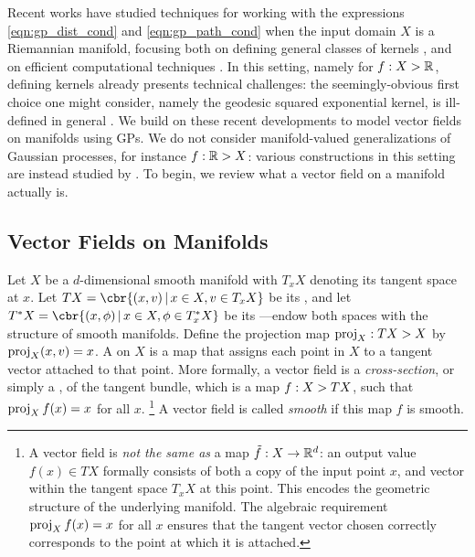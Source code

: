 Recent works have studied techniques for working with the expressions \eqref{eqn:gp_dist_cond} and \eqref{eqn:gp_path_cond} when the input domain $X$ is a Riemannian manifold, focusing both on defining general classes of kernels \cite{Borovitskiy2020}, and on efficient computational techniques \cite{wilson2020pathwise,wilson2021pathwise}.
In this setting, namely for $f : X \-> \mathbb{R}$, defining kernels already presents technical challenges: the seemingly-obvious first choice one might consider, namely the geodesic squared exponential kernel, is ill-defined in general \cite{feragen2015geodesic}.
We build on these recent developments to model vector fields on manifolds using GPs.
We do not consider manifold-valued generalizations of Gaussian processes, for instance $f : \mathbb{R} \-> X$: various constructions in this setting are instead studied by \textcite{stroock2000introduction, emery2012stochastic,mallasto2018wrapped,mallasto2019probabilistic}.
To begin, we review what a vector field on a manifold actually is.

\subsection{Vector Fields on Manifolds}

\sloppy Let $X$ be a $d$-dimensional smooth manifold with $T_x X$ denoting its tangent space at $x$.
Let ${TX = \cbr{(x, v) \,|\, x \in X, v \in T_xX}}$ be its , and let ${T^* X = \cbr{(x, \phi) \,|\, x \in X, \phi \in T_x^*X}}$ be its ---endow both spaces with the structure of smooth manifolds.
Define the projection map $\operatorname{proj}_X : TX \-> X$ by $\operatorname{proj}_X (x, v) = x$.
A  on $X$ is a map that assigns each point in $X$ to a tangent vector attached to that point.
More formally, a vector field is a \emph{cross-section}, or simply a , of the tangent bundle, which is a map $f : X \-> TX$, such that $\operatorname{proj}_X f(x) = x$ for all $x$.
\footnote{A vector field is \emph{not the same as} a map $\tilde{f} : X \to \mathbb{R}^d$: an output value $f(x) \in TX$ formally consists of both a copy of the input point $x$, and vector within the tangent space $T_x X$ at this point.
	This encodes the geometric structure of the underlying manifold.
	The algebraic requirement $\operatorname{proj}_X f(x) = x$ for all $x$ ensures that the tangent vector chosen correctly corresponds to the point at which it is attached.
}
A vector field is called \emph{smooth} if this map $f$ is smooth.

